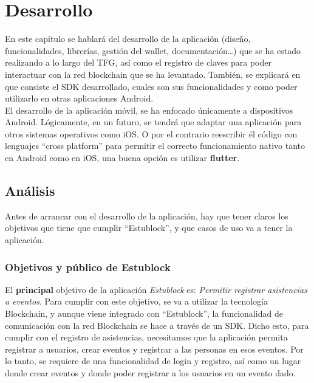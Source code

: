 \chapter{Desarrollo}
\label{cap:Desarrollo}

\setlength{\parindent}{0pt}

En este capítulo se hablará del desarrollo de la aplicación (diseño, funcionalidades, librerías, gestión del wallet, documentación\dots) que se ha estado realizando a lo largo del TFG, así como el registro de claves para poder interactuar con la red blockchain que se ha levantado. También, se explicará en que consiste el SDK desarrollado, cuales son sus funcionalidades y como poder utilizarlo en otras aplicaciones Android. \\

El desarrollo de la aplicación móvil, se ha enfocado únicamente a dispositivos Android. Lógicamente, en un futuro, se tendrá que adaptar una aplicación para otros sistemas operativos como iOS. O por el contrario reescribir él código con lenguajes ``cross platform'' para permitir el correcto funcionamiento nativo tanto en Android como en iOS, una buena opción es utilizar \textbf{flutter}\cite{flutter}.

\section{Análisis}

Antes de arrancar con el desarrollo de la aplicación, hay que tener claros los objetivos que tiene que cumplir ``Estublock'', y que casos de uso va a tener la aplicación.

\subsection{Objetivos y público de Estublock}

El \textbf{principal} objetivo de la aplicación \emph{Estublock} es: \emph{Permitir registrar asistencias a eventos}. Para cumplir con este objetivo, se va a utilizar la tecnología Blockchain, y aunque viene integrado con ``Estublock'', la funcionalidad de comunicación con la red Blockchain se hace a través de un SDK. Dicho esto, para cumplir con el registro de asistencias, necesitamos que la aplicación permita registrar a usuarios, crear eventos y registrar a las personas en esos eventos. Por lo tanto, se requiere de una funcionalidad de login y registro, así como un lugar donde crear eventos y donde poder registrar a los usuarios en un evento dado. \\

